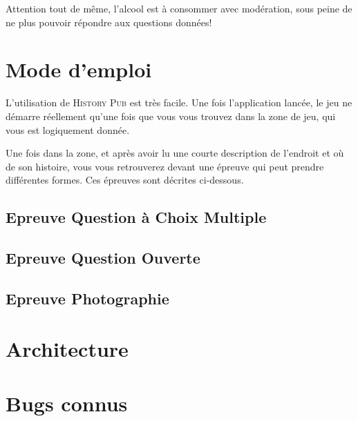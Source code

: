 \documentclass[11pt]{scrreprt}
\begin{document}
    Attention tout de même, l'alcool est à consommer avec modération, sous peine de ne plus pouvoir répondre aux questions données!

    \chapter{Mode d'emploi}
    L'utilisation de \textsc{History Pub} est très facile. Une fois l'application lancée, le jeu ne démarre réellement qu'une fois que vous vous trouvez dans la zone de jeu, qui vous est logiquement donnée.


    Une fois dans la zone, et après avoir lu une courte description de l'endroit et où de son histoire, vous vous retrouverez devant une épreuve qui peut prendre différentes formes. Ces épreuves sont décrites ci-dessous.

    \section{Epreuve Question à Choix Multiple}

    \section{Epreuve Question Ouverte}


    \section{Epreuve Photographie}


    \chapter{Architecture}

    \chapter{Bugs connus}
\end{document}
